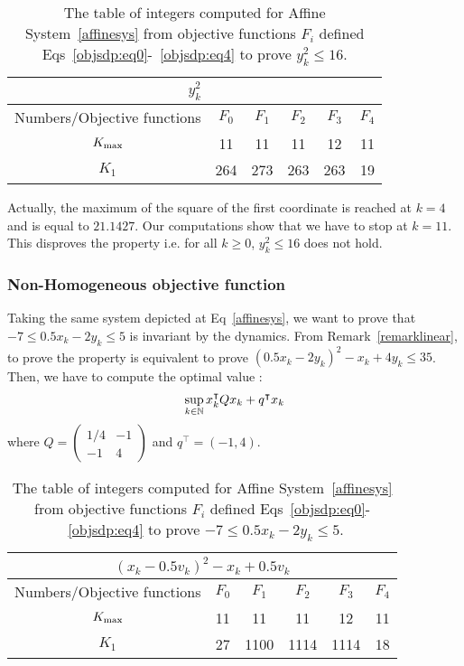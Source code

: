 \documentclass[10pt]{article}
\begin{document}
\begin{table}[h!]
\begin{center}
\begin{tabular}{|c|c|c|c|c|c|}
\hline
\multicolumn{6}{|c|}{$y_k^2$}\\
\hline
Numbers/Objective functions & $F_0$ & $F_{1}$ & $F_{2}$ & $F_3$ & $F_4$ \\
\hline
$K_{\rm max}$ &11 &11 &11 &12 &11 \\
\hline
 $K_{1}$ &264 & 273&263 & 263&19 \\
\hline
\end{tabular}
\end{center}
\caption{The table of integers computed for Affine System~\eqref{affinesys} from objective functions $F_i$ defined Eqs~\eqref{objsdp:eq0}-~\eqref{objsdp:eq4} to prove $y_k^2\leq 16$.}
\end{table}

Actually, the maximum of the square of the first coordinate is reached at $k=4$ and is equal to $21.1427$. Our computations show that we have to stop at $k=11$. This disproves the property i.e. for all $k\geq 0$, $y_k^2\leq 16$ does not hold. 


\subsubsection{Non-Homogeneous objective function}

Taking the same system depicted at Eq~\eqref{affinesys}, we want to prove that $-7\leq 0.5x_k-2y_k\leq 5$ is invariant by the dynamics. From Remark~\ref{remarklinear}, to prove the property is equivalent to prove $(0.5x_k-2 y_k)^2-x_k+4y_k\leq 35$. Then, we have to compute the optimal value :
\[
\sup_{k\in\mathbb{N}} x_k^\intercal Q x_k+q^\intercal x_k  
\]
where $Q=\begin{pmatrix} 1/4 & -1 \\ -1 & 4\end{pmatrix}$ and $q^\intercal=(-1,4)$.  
\begin{table}[h!]
\begin{center}
\begin{tabular}{|c|c|c|c|c|c|}
\hline
\multicolumn{6}{|c|}{$(x_k-0.5 v_k)^2-x_k+0.5 v_k$}\\
\hline
Numbers/Objective functions & $F_0$ & $F_{1}$ & $F_{2}$ & $F_3$ & $F_4$ \\
\hline
$K_{\rm max}$ & 11&11 &11 &12 &11 \\
\hline
 $K_{1}$ & 27 &1100 &1114 &1114 &18 \\
\hline
\end{tabular}
\end{center}
\caption{The table of integers computed for Affine System~\eqref{affinesys} from objective functions $F_i$ defined Eqs~\eqref{objsdp:eq0}-~\eqref{objsdp:eq4} to prove $-7\leq 0.5x_k-2y_k\leq 5$.}
\end{table}
\end{document}
